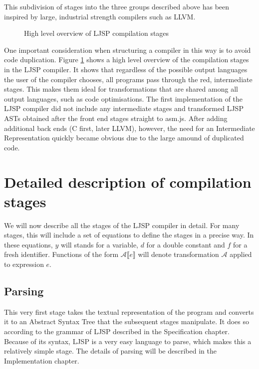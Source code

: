 \documentclass[11pt]{report}
\begin{document}
This subdivision of stages into the three groups described above has been inspired by large, industrial strength compilers such as LLVM.

\begin{figure}[ht]
\begin{center}
\caption{High level overview of LJSP compilation stages}
\end{center}
\label{highlevelstages}
\end{figure}

One important consideration when structuring a compiler in this way is to avoid code duplication. Figure \ref{highlevelstages} shows a high level overview of the compilation stages in the LJSP compiler. It shows that regardless of the possible output languages the user of the compiler chooses, all programs pass through the red, intermediate stages. This makes them ideal for transformations that are shared among all output languages, such as code optimisations. The first implementation of the LJSP compiler did not include any intermediate stages and transformed LJSP ASTs obtained after the front end stages straight to asm.js. After adding additional back ends (C first, later LLVM), however, the need for an Intermediate Representation quickly became obvious due to the large amound of duplicated code.

\section{Detailed description of compilation stages}
We will now describe all the stages of the LJSP compiler in detail. For many stages, this will include a set of equations to define the stages in a precise way. In these equations, $y$ will stands for a variable, $d$ for a double constant and $f$ for a fresh identifier. Functions of the form $\mathcal{A}\llbracket e \rrbracket$ will denote transformation $\mathcal{A}$ applied to expression $e$.

\subsection{Parsing}
This very first stage takes the textual representation of the program and converts it to an Abstract Syntax Tree that the subsequent stages manipulate. It does so according to the grammar of LJSP described in the Specification chapter. Because of its syntax, LJSP is a very easy language to parse, which makes this a relatively simple stage. The details of parsing will be described in the Implementation chapter.
\end{document}
